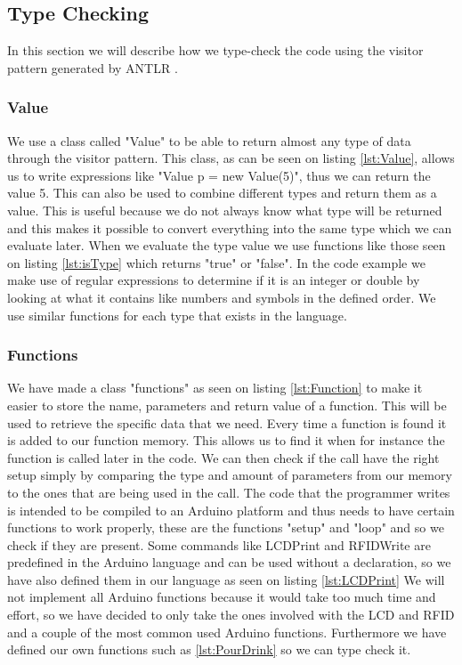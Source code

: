 \subsection{Type Checking}
\label{sec:typecheck}
In this section we will describe how we type-check the code using the visitor pattern generated by ANTLR \citep{ANTLR}.

\subsubsection{Value}
We use a class called "Value" to be able to return almost any type of data through the visitor pattern.
This class, as can be seen on listing \ref{lst:Value}, allows us to write expressions like "Value p = new Value(5)", thus we can return the value 5. This can also be used to combine different types and return them as a value. This is useful because we do not always know what type will be returned and this makes it possible to convert everything into the same type which we can evaluate later.
When we evaluate the type value we use functions like those seen on listing \ref{lst:isType} which returns "true" or "false". In the code example we make use of regular expressions to determine if it is an integer or double by looking at what it contains like numbers and symbols in the defined order. We use similar functions for each type that exists in the language.

\subsubsection{Functions}
We have made a class "functions" as seen on listing \ref{lst:Function} to make it easier to store the name, parameters and return value of a function. This will be used to retrieve the specific data that we need. Every time a function is found it is added to our function memory. This allows us to find it when for instance the function is called later in the code. We can then check if the call have the right setup simply by comparing the type and amount of parameters from our memory to the ones that are being used in the call.
The code that the programmer writes is intended to be compiled to an Arduino platform and thus needs to have certain functions to work properly, these are the functions "setup" and "loop" and so we check if they are present. Some commands like LCDPrint and RFIDWrite are predefined in the Arduino language and can be used without a declaration, so we have also defined them in our language as seen on listing \ref{lst:LCDPrint}
We will not implement all Arduino functions because it would take too much time and effort, so we have decided to only take the ones involved with the LCD and RFID and a couple of the most common used Arduino functions. Furthermore we have defined our own functions such as \ref{lst:PourDrink} so we can type check it.

